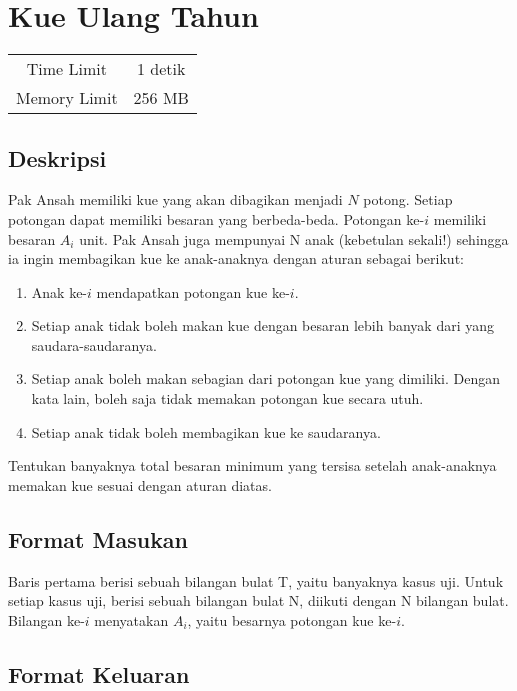 \documentclass{article}
\begin{document}
\section*{\hfil Kue Ulang Tahun\hfil}

\begin{center}
\begin{tabular}{ |cc| } 
 \hline
 Time Limit & 1 detik \\ 
 Memory Limit & 256 MB \\
 \hline
\end{tabular}
\end{center}

\subsection*{Deskripsi}
\par Pak Ansah memiliki kue yang akan dibagikan menjadi $N$ potong. Setiap potongan dapat memiliki besaran yang berbeda-beda. Potongan ke-$i$ memiliki besaran $A_i$ unit. Pak Ansah juga mempunyai N anak (kebetulan sekali!) sehingga ia ingin membagikan kue ke anak-anaknya dengan aturan sebagai berikut:

\begin{enumerate}
\item Anak ke-$i$ mendapatkan potongan kue ke-$i$.
\item Setiap anak tidak boleh makan kue dengan besaran lebih banyak dari yang saudara-saudaranya.
\item Setiap anak boleh makan sebagian dari potongan kue yang dimiliki. Dengan kata lain, boleh saja tidak memakan potongan kue secara utuh. 
\item Setiap anak tidak boleh membagikan kue ke saudaranya. 
\end{enumerate}
Tentukan banyaknya total besaran minimum yang tersisa setelah anak-anaknya memakan kue sesuai dengan aturan diatas.

\subsection*{Format Masukan}
Baris pertama berisi sebuah bilangan bulat T, yaitu banyaknya kasus uji. \newline
Untuk setiap kasus uji, berisi sebuah bilangan bulat N, diikuti dengan N bilangan bulat. Bilangan ke-$i$ menyatakan $A_i$, yaitu besarnya potongan kue ke-$i$. 

\subsection*{Format Keluaran}
\end{document}
